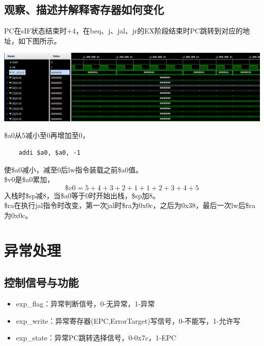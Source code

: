 \documentclass{article}
\begin{document}
\subsection{观察、描述并解释寄存器如何变化}
PC在sIF状态结束时+4，在beq、j、jal、jr的EX阶段结束时PC跳转到对应的地址，如下图所示。
\begin{center}
    \includegraphics[width = 16cm]{images/pc_waveform.png}
\end{center}
\$a0从5减小至0再增加至0，
\begin{lstlisting}
    addi $a0, $a0, -1
\end{lstlisting}
使\$a0减小，减至0后lw指令装载之前\$a0值。\\
\$v0是\$a0累加，
\[\$v0 = 5+4+3+2+1+1+2+3+4+5\]
入栈时\$sp减8，当\$a0等于0时开始出栈，\$sp加8。\\
\$ra在执行jal指令时改变，第一次jal时\$ra为0x0c，之后为0x38，最后一次lw后\$ra为0x0c。

\section{异常处理}
\subsection{控制信号与功能}
\begin{itemize}
    \item exp\_flag：异常判断信号，0-无异常，1-异常
    \item exp\_write：异常寄存器(EPC,ErrorTarget)写信号，0-不能写，1-允许写
    \item exp\_state：异常PC跳转选择信号，0-0x7c，1-EPC
\end{itemize}
\end{document}
